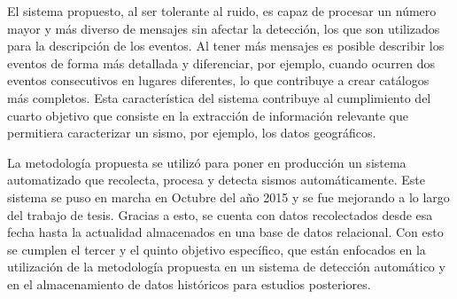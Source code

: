 \begin{conclusion}
El sistema propuesto, al ser tolerante al ruido, es capaz de procesar un número mayor y más diverso de mensajes sin afectar la detección, los que son utilizados para la descripción de los eventos. 
%
Al tener más mensajes es posible describir los eventos de forma más detallada y diferenciar, por ejemplo, cuando ocurren dos eventos consecutivos en lugares diferentes, lo que contribuye a crear catálogos más completos. 
%
Esta característica del sistema contribuye al cumplimiento del cuarto objetivo que consiste en la extracción de información relevante que permitiera caracterizar un sismo, por ejemplo, los datos geográficos.


La metodología propuesta se utilizó para poner en producción un sistema automatizado que recolecta, procesa y detecta sismos automáticamente. 
%
Este sistema se puso en marcha en Octubre del año 2015 y se fue mejorando a lo largo del trabajo de tesis. 
%
Gracias a esto, se cuenta con datos recolectados desde esa fecha hasta la actualidad almacenados en una base de datos relacional.
%
Con esto se cumplen el tercer y el quinto objetivo específico, que están enfocados en la utilización de la metodología propuesta en un sistema de detección automático y en el almacenamiento de datos históricos para estudios posteriores. 




\end{conclusion}
